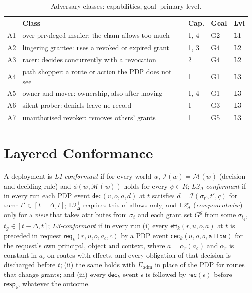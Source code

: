 \documentclass[sigconf,review,anonymous]{acmart}
\newcommand{\allowv}{\mathtt{allow}}
\newcommand{\ev}[1]{\mathsf{#1}}
\begin{document}
\begin{table}[t]
\caption{Adversary classes: capabilities, goal, primary level.}
\label{tab:adv}
\small
\begin{tabularx}{\columnwidth}{@{}l@{\;}X@{\;}l@{\;}l@{\;}l@{}}
\toprule
 & Class & Cap. & Goal & Lvl \\
\midrule
A1 & over-privileged insider: the chain allows too much & 1, 4 & G2 & L1 \\
A2 & lingering grantee: uses a revoked or expired grant & 1, 3 & G4 & L2 \\
A3 & racer: decides concurrently with a revocation & 2 & G4 & L2 \\
A4 & path shopper: a route or action the PDP does not see & 1 & G1 & L3 \\
A5 & owner and mover: ownership, also after moving & 1, 4 & G1 & L3 \\
A6 & silent prober: denials leave no record & 1 & G3 & L3 \\
A7 & unauthorised revoker: removes others' grants & 1 & G5 & L3 \\
\bottomrule
\end{tabularx}
\end{table}

\section{Layered Conformance}
\label{sec:levels}

\begin{definition}\label{def:levels}
A deployment is
\emph{L1-conformant} if for every world $w$, $\mathcal{I}(w)=\mathcal{M}(w)$ (decision and deciding rule) and
$\phi(w,\mathcal{M}(w))$ holds for every $\phi\in R$;
\emph{L2$_\Delta$-conformant} if in every run each PDP event $\ev{dec}(u,o,a,d)$ at $t$ satisfies
$d=\mathcal{I}(\sigma_{t'},t',q)$ for some $t'\in[t-\Delta,t]$; L2$^+_\Delta$ requires this of allows only, and
L2$^c_\Delta$ (\emph{componentwise}) only for a \emph{view} that takes attributes from $\sigma_t$ and each grant set
$G^g$ from some $\sigma_{t_g}$, $t_g\in[t-\Delta,t]$;
\emph{L3-conformant} if in every run (i) every $\ev{eff}_k(r,u,o,a)$ at $t$ is preceded in request
$\ev{req}_k(r,u,o,a_c,c)$ by a PDP event $\ev{dec}_k(u,o,a,\allowv)$ for the request's own principal, object and
context, where $a=\alpha_r(a_c)$ and $\alpha_r$ is constant in $a_c$ on routes with effects, and every obligation
of that decision is discharged before $t$; (ii) the same holds with $\Pi_{\mathrm{adm}}$ in place of the PDP for
routes that change grants; and (iii) every $\ev{dec}_k$ event $e$ is followed by $\ev{rec}(e)$ before
$\ev{resp}_k$, whatever the outcome.
\end{definition}
\end{document}
